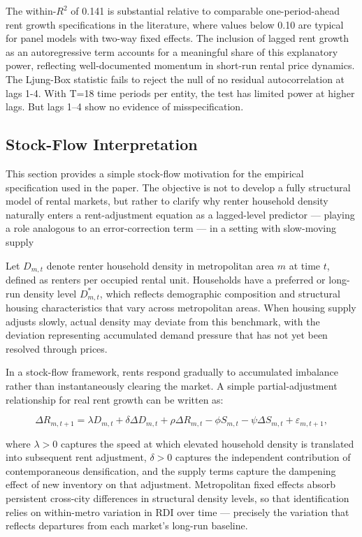 \documentclass[pdflatex,sn-apa]{sn-jnl}%
\theoremstyle{thmstyleone}%
\theoremstyle{thmstyletwo}%
\theoremstyle{thmstylethree}%
\begin{document}
The within-$R^2$ of 0.141 is substantial relative to comparable one-period-ahead 
rent growth specifications in the literature, where values below 0.10 are typical 
for panel models with two-way fixed effects. The inclusion of lagged rent growth 
as an autoregressive term accounts for a meaningful share of this explanatory 
power, reflecting well-documented momentum in short-run rental price dynamics. 
The Ljung-Box statistic fails to reject the null of no residual autocorrelation 
at lags 1-4. With T=18 time periods per entity, the test has limited power at higher lags. But lags 1–4 show no evidence of misspecification.



\subsection{Stock-Flow Interpretation}

This section provides a simple stock-flow motivation for the empirical 
specification used in the paper. The objective is not to develop a fully 
structural model of rental markets, but rather to clarify why renter household density naturally enters a rent-adjustment equation as a lagged-level predictor — playing a role analogous to an error-correction term — in a setting with slow-moving supply

Let $D_{m,t}$ denote renter household density in metropolitan area $m$ at time 
$t$, defined as renters per occupied rental unit. Households have a preferred or 
long-run density level $D^*_{m,t}$, which reflects demographic composition and 
structural housing characteristics that vary across metropolitan areas. When 
housing supply adjusts slowly, actual density may deviate from this benchmark, 
with the deviation representing accumulated demand pressure that has not yet been 
resolved through prices.

In a stock-flow framework, rents respond gradually to accumulated imbalance 
rather than instantaneously clearing the market. A simple partial-adjustment 
relationship for real rent growth can be written as:

\begin{equation}
\Delta R_{m,t+1} = \lambda D_{m,t} + \delta \Delta D_{m,t} + \rho \Delta R_{m,t} 
- \phi S_{m,t} - \psi \Delta S_{m,t} + \varepsilon_{m,t+1},
\end{equation}

where $\lambda > 0$ captures the speed at which elevated household density is 
translated into subsequent rent adjustment, $\delta > 0$ captures the 
independent contribution of contemporaneous densification, and the supply terms 
capture the dampening effect of new inventory on that adjustment. Metropolitan 
fixed effects absorb persistent cross-city differences in structural density 
levels, so that identification relies on within-metro variation in RDI over 
time --- precisely the variation that reflects departures from each market's 
long-run baseline.
\end{document}
